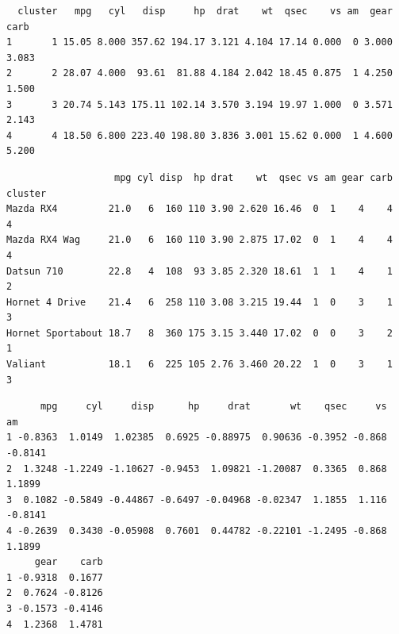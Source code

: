 \documentclass[12pt,brazil,oneside]{book}
\newenvironment{Shaded}{\begin{snugshade}}{\end{snugshade}}
\newcommand{\DataTypeTok}[1]{\textcolor[rgb]{0.13,0.29,0.53}{#1}}
\newcommand{\KeywordTok}[1]{\textcolor[rgb]{0.13,0.29,0.53}{\textbf{#1}}}
\newcommand{\NormalTok}[1]{#1}
\newcommand{\OperatorTok}[1]{\textcolor[rgb]{0.81,0.36,0.00}{\textbf{#1}}}
\begin{document}
\begin{Shaded}
\end{Shaded}

\begin{verbatim}
  cluster   mpg   cyl   disp     hp  drat    wt  qsec    vs am  gear  carb
1       1 15.05 8.000 357.62 194.17 3.121 4.104 17.14 0.000  0 3.000 3.083
2       2 28.07 4.000  93.61  81.88 4.184 2.042 18.45 0.875  1 4.250 1.500
3       3 20.74 5.143 175.11 102.14 3.570 3.194 19.97 1.000  0 3.571 2.143
4       4 18.50 6.800 223.40 198.80 3.836 3.001 15.62 0.000  1 4.600 5.200
\end{verbatim}

\begin{Shaded}
\end{Shaded}

\begin{verbatim}
                   mpg cyl disp  hp drat    wt  qsec vs am gear carb cluster
Mazda RX4         21.0   6  160 110 3.90 2.620 16.46  0  1    4    4       4
Mazda RX4 Wag     21.0   6  160 110 3.90 2.875 17.02  0  1    4    4       4
Datsun 710        22.8   4  108  93 3.85 2.320 18.61  1  1    4    1       2
Hornet 4 Drive    21.4   6  258 110 3.08 3.215 19.44  1  0    3    1       3
Hornet Sportabout 18.7   8  360 175 3.15 3.440 17.02  0  0    3    2       1
Valiant           18.1   6  225 105 2.76 3.460 20.22  1  0    3    1       3
\end{verbatim}

\begin{Shaded}
\end{Shaded}

\begin{verbatim}
      mpg     cyl     disp      hp     drat       wt    qsec     vs      am
1 -0.8363  1.0149  1.02385  0.6925 -0.88975  0.90636 -0.3952 -0.868 -0.8141
2  1.3248 -1.2249 -1.10627 -0.9453  1.09821 -1.20087  0.3365  0.868  1.1899
3  0.1082 -0.5849 -0.44867 -0.6497 -0.04968 -0.02347  1.1855  1.116 -0.8141
4 -0.2639  0.3430 -0.05908  0.7601  0.44782 -0.22101 -1.2495 -0.868  1.1899
     gear    carb
1 -0.9318  0.1677
2  0.7624 -0.8126
3 -0.1573 -0.4146
4  1.2368  1.4781
\end{verbatim}
\end{document}
